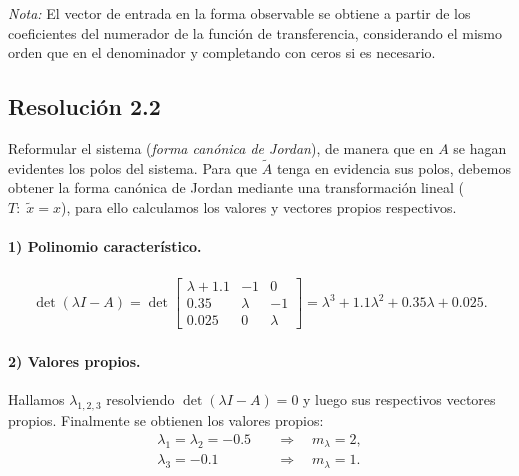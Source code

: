 \documentclass[
  11pt,
  letterpaper,
   addpoints,
  answers
  ]{exam}
\begin{document}
\begin{questions}
\begin{solution}
	\textit{Nota:} El vector de entrada en la forma observable se obtiene a partir de los coeficientes del numerador de la función de transferencia, considerando el mismo orden que en el denominador y completando con ceros si es necesario.

\subsection*{Resolución 2.2}

Reformular el sistema (\emph{forma canónica de Jordan}), de manera que en $A$ se hagan evidentes los polos del sistema. Para que $\tilde A$ tenga en evidencia sus polos, debemos obtener la forma canónica de Jordan mediante una transformación lineal ($T:\;\tilde x = x$), para ello calculamos los valores y vectores propios respectivos.

\paragraph{1) Polinomio característico.} 
\begin{align}
\det(\lambda I-A)
= \det\!\begin{bmatrix}
\lambda+1.1 & -1 & 0\\
0.35 & \lambda & -1\\
0.025 & 0 & \lambda
\end{bmatrix}
= \lambda^{3}+1.1\lambda^{2}+0.35\lambda+0.025. \label{eq:charpoly}
\end{align}

\paragraph{2) Valores propios.} Hallamos $\lambda_{1,2,3}$ resolviendo $\det(\lambda I-A)=0$ y luego sus respectivos vectores propios. Finalmente se obtienen los valores propios:
\begin{align}
\lambda_1=\lambda_2=-0.5 \quad &\Rightarrow\quad m_\lambda=2, \\
\lambda_3=-0.1 \quad &\Rightarrow\quad m_\lambda=1.
\end{align}


\end{solution}
\end{questions}
\end{document}
